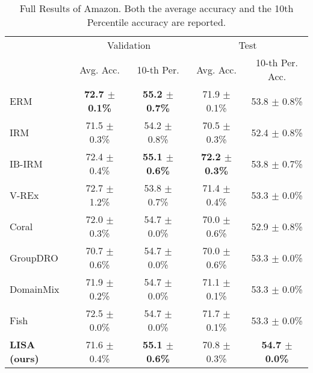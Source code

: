 \begin{table*}[h]
\small
\caption{Full Results of Amazon. Both the average accuracy and the 10th Percentile accuracy are reported.}
\label{tab:amazon_full}
\begin{center}
\begin{tabular}{l|cc|cc}
\toprule
\multirow{2}{*}{}  & \multicolumn{2}{c}{Validation} & \multicolumn{2}{c}{Test}\\
& Avg. Acc. & 10-th Per. & Avg. Acc. & 10-th Per. Acc. \\\midrule
ERM &  \textbf{72.7 $\pm$ 0.1\%} & \textbf{55.2 $\pm$ 0.7\%} & 71.9 $\pm$ 0.1\%  & 53.8 $\pm$ 0.8\% \\
IRM  & 71.5 $\pm$ 0.3\% & 54.2 $\pm$ 0.8\% & 70.5 $\pm$ 0.3\% & 52.4 $\pm$ 0.8\% \\
IB-IRM & 72.4 $\pm$ 0.4\% & \textbf{55.1 $\pm$ 0.6\%} & \textbf{72.2 $\pm$ 0.3\%} & 53.8 $\pm$ 0.7\% \\
V-REx  & 72.7 $\pm$ 1.2\% & 53.8 $\pm$ 0.7\% & 71.4 $\pm$ 0.4\% & 53.3 $\pm$ 0.0\% \\
Coral & 72.0 $\pm$ 0.3\% & 54.7 $\pm$ 0.0\% & 70.0 $\pm$ 0.6\% & 52.9 $\pm$ 0.8\% \\
GroupDRO & 70.7 $\pm$ 0.6\% & 54.7 $\pm$ 0.0\% & 70.0 $\pm$ 0.6\% & 53.3 $\pm$ 0.0\% \\
DomainMix & 71.9 $\pm$ 0.2\% & 54.7 $\pm$ 0.0\% & 71.1 $\pm$ 0.1\% & 53.3 $\pm$ 0.0\% \\
Fish & 72.5 $\pm$ 0.0\% & 54.7 $\pm$ 0.0\% & 71.7 $\pm$ 0.1\% & 53.3 $\pm$ 0.0\% \\
\midrule
\textbf{LISA (ours)} & 71.6 $\pm$ 0.4\% & \textbf{55.1 $\pm$ 0.6\%} & 70.8 $\pm$ 0.3\% & \textbf{54.7 $\pm$ 0.0\%} \\
\bottomrule
\end{tabular}
\end{center}
\end{table*}